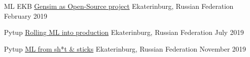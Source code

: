 \begin{cventries}
  \cventry
    {ML EKB} %
    {\href{https://slides.com/menshikh_iv/gensim-oss-mlekb}{Gensim as Open-Source project}} %
    {Ekaterinburg, Russian Federation} %
    {February 2019} %
    {
    }

  \cventry
    {Pytup} %
    {\href{https://slides.com/menshikh_iv/pytup_katim_ml_v_production}{Rolling ML into production}} %
    {Ekaterinburg, Russian Federation} %
    {July 2019} %
    {
    }

    \cventry
    {Pytup} %
    {\href{https://slides.com/menshikh_iv/ml_shit_n_sticks}{ML from sh*t \& sticks}} %
    {Ekaterinburg, Russian Federation} %
    {November 2019} %
    {
    }


\end{cventries}
